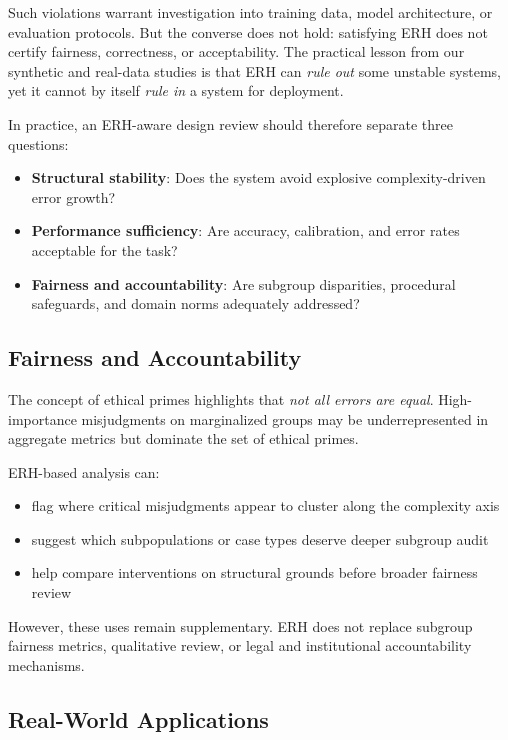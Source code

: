 \documentclass[12pt,a4paper]{article}
\theoremstyle{definition}
\theoremstyle{remark}
\begin{document}
Such violations warrant investigation into training data, model architecture, or evaluation protocols. But the converse does not hold: satisfying ERH does not certify fairness, correctness, or acceptability. The practical lesson from our synthetic and real-data studies is that ERH can \emph{rule out} some unstable systems, yet it cannot by itself \emph{rule in} a system for deployment.

In practice, an ERH-aware design review should therefore separate three questions:
\begin{itemize}
    \item \textbf{Structural stability}: Does the system avoid explosive complexity-driven error growth?
    \item \textbf{Performance sufficiency}: Are accuracy, calibration, and error rates acceptable for the task?
    \item \textbf{Fairness and accountability}: Are subgroup disparities, procedural safeguards, and domain norms adequately addressed?
\end{itemize}

\subsection{Fairness and Accountability}

The concept of ethical primes highlights that \emph{not all errors are equal}. High-importance misjudgments on marginalized groups may be underrepresented in aggregate metrics but dominate the set of ethical primes.

ERH-based analysis can:
\begin{itemize}
    \item flag where critical misjudgments appear to cluster along the complexity axis
    \item suggest which subpopulations or case types deserve deeper subgroup audit
    \item help compare interventions on structural grounds before broader fairness review
\end{itemize}

However, these uses remain supplementary. ERH does not replace subgroup fairness metrics, qualitative review, or legal and institutional accountability mechanisms.

\subsection{Real-World Applications}
\end{document}
